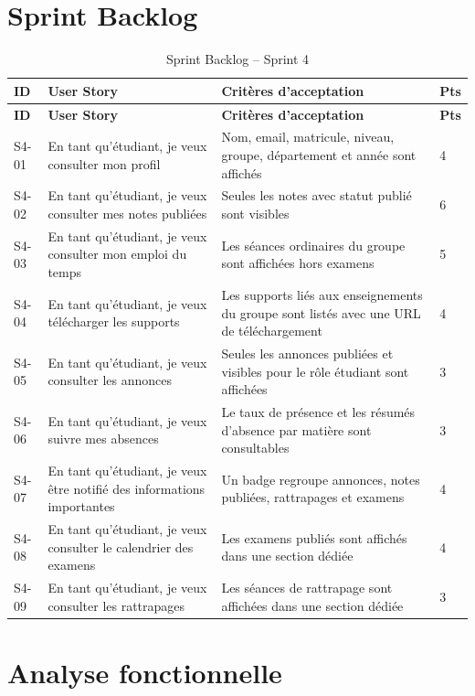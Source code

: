 \documentclass[12pt,a4paper]{report}
\begin{document}
\section{Sprint Backlog}

\begin{longtable}{|p{1.6cm}|p{6cm}|p{5.6cm}|p{1.4cm}|}
\caption{Sprint Backlog -- Sprint 4}\\
\hline
\textbf{ID} & \textbf{User Story} & \textbf{Critères d'acceptation} & \textbf{Pts} \\
\hline
\endfirsthead
\hline
\textbf{ID} & \textbf{User Story} & \textbf{Critères d'acceptation} & \textbf{Pts} \\
\hline
\endhead
S4-01 & En tant qu'étudiant, je veux consulter mon profil & Nom, email, matricule, niveau, groupe, département et année sont affichés & 4 \\
\hline
S4-02 & En tant qu'étudiant, je veux consulter mes notes publiées & Seules les notes avec statut publié sont visibles & 6 \\
\hline
S4-03 & En tant qu'étudiant, je veux consulter mon emploi du temps & Les séances ordinaires du groupe sont affichées hors examens & 5 \\
\hline
S4-04 & En tant qu'étudiant, je veux télécharger les supports & Les supports liés aux enseignements du groupe sont listés avec une URL de téléchargement & 4 \\
\hline
S4-05 & En tant qu'étudiant, je veux consulter les annonces & Seules les annonces publiées et visibles pour le rôle étudiant sont affichées & 3 \\
\hline
S4-06 & En tant qu'étudiant, je veux suivre mes absences & Le taux de présence et les résumés d'absence par matière sont consultables & 3 \\
\hline
S4-07 & En tant qu'étudiant, je veux être notifié des informations importantes & Un badge regroupe annonces, notes publiées, rattrapages et examens & 4 \\
\hline
S4-08 & En tant qu'étudiant, je veux consulter le calendrier des examens & Les examens publiés sont affichés dans une section dédiée & 4 \\
\hline
S4-09 & En tant qu'étudiant, je veux consulter les rattrapages & Les séances de rattrapage sont affichées dans une section dédiée & 3 \\
\hline
\end{longtable}

\section{Analyse fonctionnelle}
\end{document}
